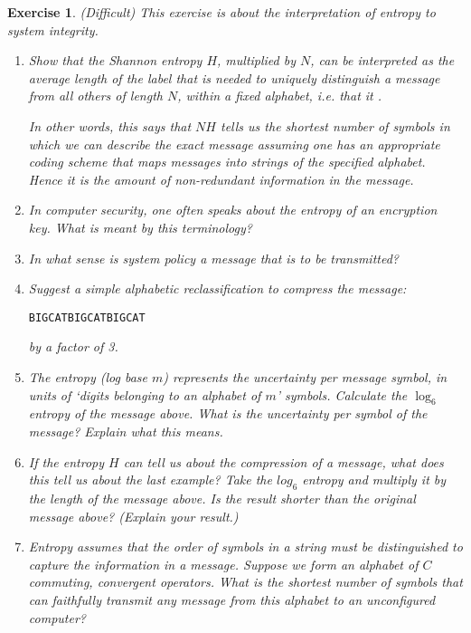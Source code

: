 \documentclass{book}
\newtheorem{exercise}{Exercise}
\begin{document}
\begin{exercise}
(Difficult) This exercise is about the interpretation of entropy to system integrity.
\begin{enumerate}

\item Show that the Shannon entropy $H$, multiplied by $N$, can be interpreted
as the average length of the label that is needed to uniquely
distinguish a message from all others of length $N$, within a fixed
alphabet, i.e. that it .

In other words, this says that $NH$ tells us the shortest number of
symbols in which we can describe the exact message assuming one has an
appropriate coding scheme that maps messages into strings
of the specified alphabet. Hence it is the
amount of non-redundant information in the message.


\item In computer security, one often speaks about the entropy of an
encryption key. What is meant by this terminology?

\item In what sense is system policy a message that is to be transmitted?

\item Suggest a simple alphabetic reclassification to compress the message:
\begin{verbatim}
BIGCATBIGCATBIGCAT
\end{verbatim}
by a factor of 3.

\item The entropy (log base $m$) represents the uncertainty per message symbol, in units of `digits belonging to an alphabet of $m$' symbols.
Calculate the $\log_6$ entropy of the message above. What is the
uncertainty per symbol of the message? Explain what this means.

\item If the entropy $H$ can tell us about the compression of a message,
what does this tell us about the last example?  
Take the $log_6$ entropy and multiply it by the length of the message
above. Is the result shorter than the original message above? (Explain
your result.)

\item Entropy assumes that the order of symbols in a string 
must be distinguished
to capture the information in a message. Suppose we
form an alphabet of $C$ commuting, convergent operators. What is the
shortest number of symbols that can faithfully transmit {\em any}
message from this alphabet to an unconfigured computer?


\end{enumerate}
\end{exercise}
\end{document}
